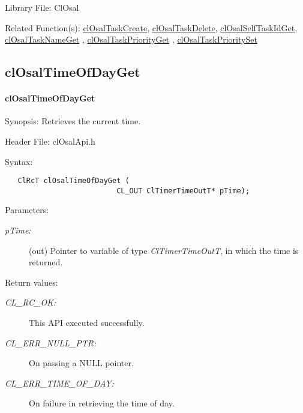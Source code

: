 \begin{Desc}
\item[Library File:]Cl\-Osal\end{Desc}
\begin{Desc}
\item[Related Function(s):]\hyperlink{pageosal103}{cl\-Osal\-Task\-Create}, \hyperlink{pageosal104}{cl\-Osal\-Task\-Delete}, 
\hyperlink{pageosal105}{cl\-Osal\-Self\-Task\-Id\-Get}, \hyperlink{pageosal106}{cl\-Osal\-Task\-Name\-Get} , 
\hyperlink{pageosal107}{cl\-Osal\-Task\-Priority\-Get} , \hyperlink{pageosal108}{cl\-Osal\-Task\-Priority\-Set} \end{Desc}

\newpage
\subsection{clOsalTimeOfDayGet}
\hypertarget{pageosal110}{}\paragraph{cl\-Osal\-Time\-Of\-Day\-Get}\label{pageosal110}
\begin{Desc}
\item[Synopsis:]Retrieves the current time.\end{Desc}
\begin{Desc}
\item[Header File:]clOsalApi.h\end{Desc}
\begin{Desc}
\item[Syntax:]

\footnotesize\begin{verbatim}   ClRcT clOsalTimeOfDayGet (
                          CL_OUT ClTimerTimeOutT* pTime);
\end{verbatim}
\normalsize
\end{Desc}
\begin{Desc}
\item[Parameters:]
\begin{description}
\item[{\em p\-Time:}](out) Pointer to variable of type \textit{ClTimerTimeOutT}, in which the time is returned.\end{description}
\end{Desc}
\begin{Desc}
\item[Return values:]
\begin{description}
\item[{\em CL\_\-RC\_\-OK:}]This API executed successfully. \item[{\em CL\_\-ERR\_\-NULL\_\-PTR:}]On passing a NULL pointer. \item[{\em CL\_\-ERR\_\-TIME\_\-OF\_\-DAY:}]On failure in retrieving the time of day.\end{description}
\end{Desc}

